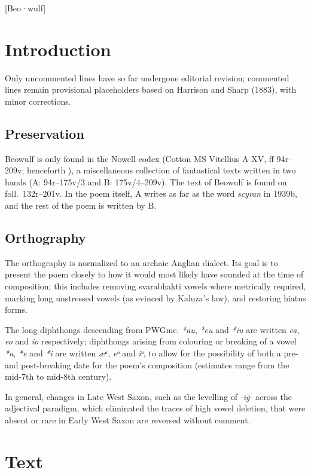 [Beo·wulf]

\section{Introduction}

Only uncommented lines have so far undergone editorial revision; commented lines remain provisional placeholders based on Harrison and Sharp (1883), with minor corrections.

\subsection{Preservation}

Beowulf is only found in the Nowell codex (Cotton MS Vitellius A XV, ff 94r–209v; henceforth \BeoMS), a miscellaneous collection of fantastical texts written in two hands (A: 94r--175v/3 and B: 175v/4--209v).  The text of Beowulf is found on foll.~132r--201v.  In the poem itself, A writes as far as the word \emph{scyran} in 1939b, and the rest of the poem is written by B.

\subsection{Orthography}

The orthography is normalized to an archaic Anglian dialect. Its goal is to present the poem closely to how it would most likely have sounded at the time of composition; this includes removing svarabhakti vowels where metrically required, marking long unstressed vowels (as evinced by Kaluza's law), and restoring hiatus forms. 

The long diphthongs descending from PWGmc. \emph{*au}, \emph{*eu} and \emph{*iu} are written \emph{ea}, \emph{eo} and \emph{io} respectively; diphthongs arising from colouring or breaking of a vowel \emph{*a}, \emph{*e} and \emph{*i} are written \emph{æᵃ}, \emph{eᵒ} and \emph{iᵒ}, to allow for the possibility of both a pre- and post-breaking date for the poem's composition (estimates range from the mid-7th to mid-8th century). 

In general, changes in Late West Saxon, such as the levelling of \emph{-iġ-} across the adjectival paradigm, which eliminated the traces of high vowel deletion, that were absent or rare in Early West Saxon are reversed without comment.

\newpage
\section{Text}


